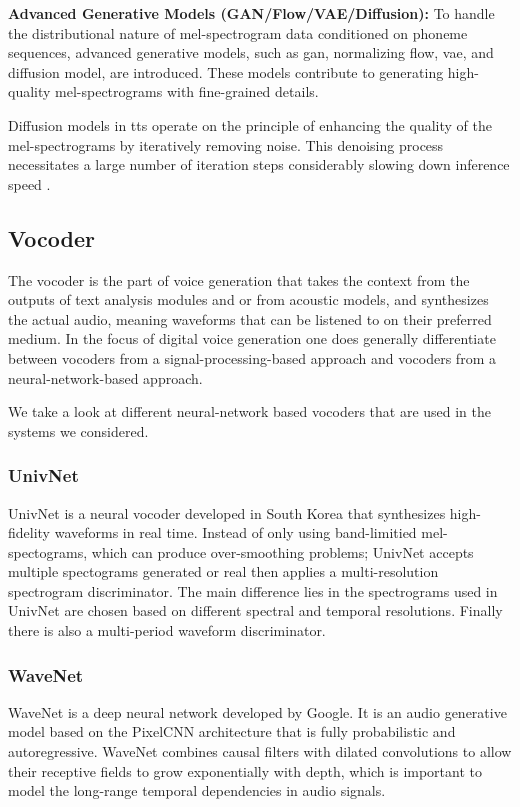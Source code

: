 \textbf{Advanced Generative Models (GAN/Flow/VAE/Diffusion):} To handle the distributional nature of mel-spectrogram data conditioned on phoneme sequences, advanced generative models, such as \gls{gan}, normalizing flow, \gls{vae}, and diffusion model, are introduced. These models contribute to generating high-quality mel-spectrograms with fine-grained details.

Diffusion models in \gls{tts} operate on the principle of enhancing the quality of the mel-spectrograms by iteratively removing noise. This denoising process necessitates a large number of iteration steps considerably slowing down inference speed \cite{acoustic2023models}.

\subsection{Vocoder}

The vocoder is the part of voice generation that takes the context from the outputs of text analysis modules and or from acoustic models, and synthesizes the actual audio, meaning waveforms that can be listened to on their preferred medium. In the focus of digital voice generation one does generally differentiate between vocoders from a signal-processing-based approach and vocoders from a neural-network-based approach\cite{Tan2023vocoder}.

We take a look at different neural-network based vocoders that are used in the systems we considered.

\subsubsection{UnivNet}

UnivNet is a neural vocoder developed in South Korea that synthesizes high-fidelity waveforms in real time. Instead of only using band-limitied mel-spectograms, which can produce over-smoothing problems; UnivNet accepts multiple spectograms generated or real then applies a multi-resolution spectrogram discriminator. The main difference lies in the spectrograms used in UnivNet are chosen based on different spectral and temporal resolutions. Finally there is also a multi-period waveform discriminator.\cite{jang2021univnet}

\subsubsection{WaveNet}

WaveNet is a deep neural network developed by Google. It is an audio generative model based on the PixelCNN architecture that is fully probabilistic and autoregressive. WaveNet combines causal filters with dilated convolutions to allow their receptive fields to grow exponentially with depth, which is important to model
the long-range temporal dependencies in audio signals.\cite{oord2016wavenet}

